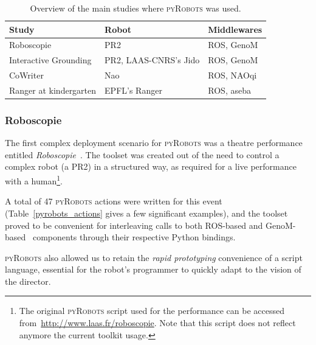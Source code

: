 \documentclass[letterpaper, 10pt, conference]{ieeeconf}      %
\newcommand{\pyRobots}{\textsc{pyRobots}}
\begin{document}
\begin{table}[h]
    \centering
    \begin{tabular}{lll}
        \toprule
        Study                 & Robot & Middlewares \\ \midrule
        Roboscopie            & PR2       & ROS, {\sc GenoM} \\
        Interactive Grounding & PR2, LAAS-CNRS's Jido & ROS, {\sc GenoM} \\
        CoWriter              & Nao       & ROS, NAOqi  \\
        Ranger at kindergarten & EPFL's Ranger & ROS, aseba  \\
        \bottomrule
    \end{tabular}
    \caption{Overview of the main studies where \pyRobots{} was used.}
\end{table}

\subsubsection{Roboscopie} The first complex deployment scenario for \pyRobots{} was
a theatre performance entitled \emph{Roboscopie}~\cite{lemaignan2012roboscopie}.
The toolset was created out of the need to control a complex robot (a PR2) in a structured way, as required for a live performance with a
human\footnote{The original \pyRobots{} script used for the performance can be
accessed from~\url{http://www.laas.fr/roboscopie}. Note that this script does
not reflect anymore the current toolkit usage.}.

A total of 47 \pyRobots{} actions were written for this event
(Table~\ref{pyrobots_actions} gives a few significant examples), and the toolset
proved to be convenient for interleaving calls to both ROS-based and
{\sc GenoM}-based~\cite{mallet2010genom3} components through their respective
Python bindings.

\pyRobots{} also allowed us to retain the \emph{rapid prototyping} convenience
of a script language, essential for the robot's programmer to quickly adapt to
the vision of the director.
\end{document}
